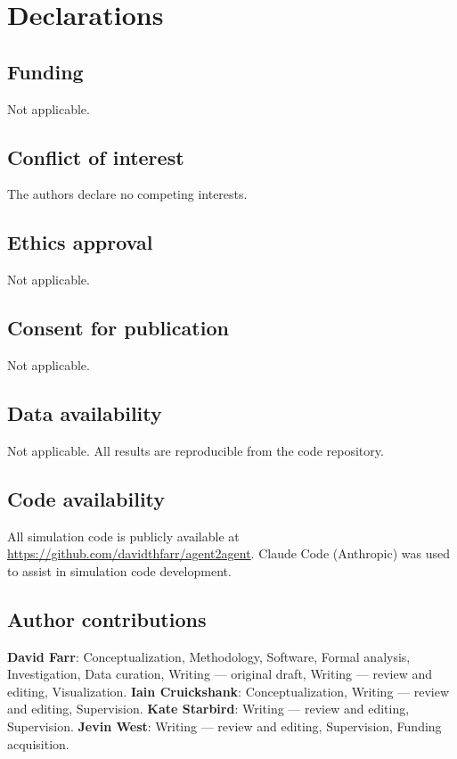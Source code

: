 \documentclass[pdflatex,sn-mathphys-num]{sn-jnl}%
\theoremstyle{thmstyleone}%
\theoremstyle{thmstyletwo}%
\theoremstyle{thmstylethree}%
\begin{document}
\section*{Declarations}


\subsection*{Funding}
Not applicable.

\subsection*{Conflict of interest}
The authors declare no competing interests.

\subsection*{Ethics approval}
Not applicable.

\subsection*{Consent for publication}
Not applicable.

\subsection*{Data availability}
Not applicable. All results are reproducible from the 
code repository.

\subsection*{Code availability}
All simulation code is publicly available at 
\url{https://github.com/davidthfarr/agent2agent}. 
Claude Code (Anthropic) was used to assist in 
simulation code development.

\subsection*{Author contributions}
\textbf{David Farr}: Conceptualization, Methodology, 
Software, Formal analysis, Investigation, 
Data curation, Writing --- original draft, 
Writing --- review and editing, Visualization.
\textbf{Iain Cruickshank}: Conceptualization, 
Writing --- review and editing, Supervision.
\textbf{Kate Starbird}: Writing --- review and editing, 
Supervision.
\textbf{Jevin West}: Writing --- review and editing, 
Supervision, Funding acquisition.
\end{document}
